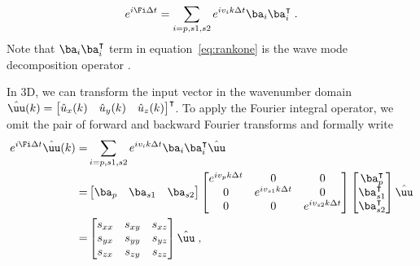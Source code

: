 \begin{equation}
\label{eq:rankone}
e^{i\Fi \Delta t} = \sum\limits_{i=p,s1,s2} e^{i v_i k \Delta t} \ba_i \ba_i^\intercal \; .
\end{equation}
Note that $\ba_i \ba_i^\intercal$ term in equation~\ref{eq:rankone} is the wave mode decomposition operator \cite[]{joethesis,zm}.

In 3D, we can transform the input vector in the wavenumber domain $\hat{\uu}(k) = \begin{bmatrix} \hat{u}_x(k) & \hat{u}_y(k) & \hat{u}_z(k) \end{bmatrix}^\intercal$. To apply the Fourier integral operator, we omit the pair of forward and backward Fourier transforms and formally write
\begin{eqnarray}
    \label{eq:osop}
e^{i\Fi \Delta t} \hat{\uu}(k) =&
\sum\limits_{i=p,s1,s2} e^{i v_i k \Delta t} \ba_i \ba_i^\intercal \hat{\uu} \\ \nonumber
=& \begin{bmatrix} \ba_p & \ba_{s1} & \ba_{s2}\end{bmatrix} 
\begin{bmatrix} 
e^{i v_p k \Delta t} & 0 & 0 \\ 
0 & e^{i v_{s1} k \Delta t} & 0 \\ 
0 & 0 & e^{i v_{s2} k \Delta t} 
\end{bmatrix} 
\begin{bmatrix} \ba_p^\intercal \\ \ba_{s1}^\intercal \\ \ba_{s2}^\intercal \end{bmatrix} \hat{\uu} \\ \nonumber
=& \begin{bmatrix}
s_{xx} & s_{xy} & s_{xz} \\
s_{yx} & s_{yy} & s_{yz} \\
s_{zx} & s_{zy} & s_{zz} \\
\end{bmatrix} \hat{\uu} \;,
\end{eqnarray}
